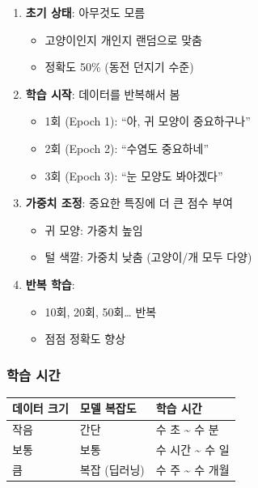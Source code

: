 \documentclass[a4paper, 11pt]{article}
\providecommand{\tightlist}{%
  \setlength{\itemsep}{0pt}\setlength{\parskip}{0pt}}
\begin{document}
\begin{enumerate}
\def\labelenumi{\arabic{enumi}.}
\tightlist
\item
  \textbf{초기 상태}: 아무것도 모름

  \begin{itemize}
  \tightlist
  \item
    고양이인지 개인지 랜덤으로 맞춤
  \item
    정확도 50\% (동전 던지기 수준)
  \end{itemize}
\item
  \textbf{학습 시작}: 데이터를 반복해서 봄

  \begin{itemize}
  \tightlist
  \item
    1회 (Epoch 1): ``아, 귀 모양이 중요하구나''
  \item
    2회 (Epoch 2): ``수염도 중요하네''
  \item
    3회 (Epoch 3): ``눈 모양도 봐야겠다''
  \end{itemize}
\item
  \textbf{가중치 조정}: 중요한 특징에 더 큰 점수 부여

  \begin{itemize}
  \tightlist
  \item
    귀 모양: 가중치 높임
  \item
    털 색깔: 가중치 낮춤 (고양이/개 모두 다양)
  \end{itemize}
\item
  \textbf{반복 학습}:

  \begin{itemize}
  \tightlist
  \item
    10회, 20회, 50회\ldots{} 반복
  \item
    점점 정확도 향상
  \end{itemize}
\end{enumerate}

\hypertarget{uxd559uxc2b5-uxc2dcuxac04}{%
\subsubsection{학습 시간}\label{uxd559uxc2b5-uxc2dcuxac04}}

\begin{longtable}{p{4.5cm}p{4.5cm}p{5.0cm}}
\toprule\noalign{}
데이터 크기 & 모델 복잡도 & 학습 시간 \\
\midrule\noalign{}
\endhead
\bottomrule\noalign{}
\endlastfoot
작음 & 간단 & 수 초 \textasciitilde{} 수 분 \\
보통 & 보통 & 수 시간 \textasciitilde{} 수 일 \\
큼 & 복잡 (딥러닝) & 수 주 \textasciitilde{} 수 개월 \\
\end{longtable}
\end{document}
